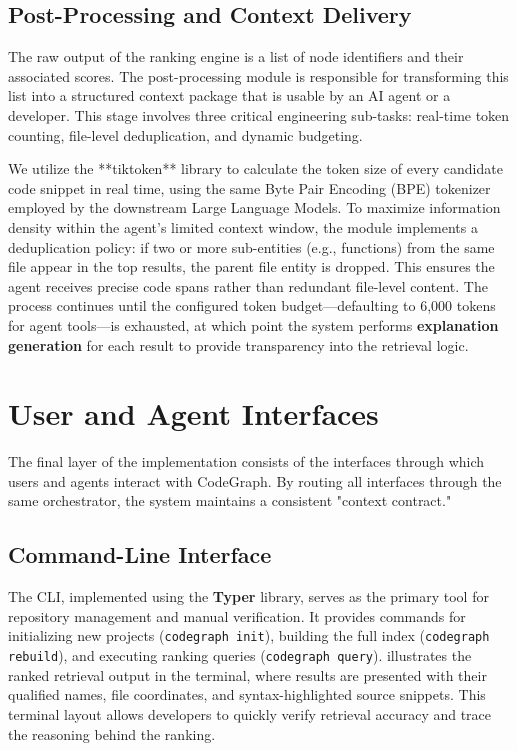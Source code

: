 \subsection{Post-Processing and Context Delivery}
\label{subsec:post-processing}

The raw output of the ranking engine is a list of node identifiers and their associated scores. The post-processing module is responsible for transforming this list into a structured context package that is usable by an AI agent or a developer. This stage involves three critical engineering sub-tasks: real-time token counting, file-level deduplication, and dynamic budgeting.

We utilize the **tiktoken** library to calculate the token size of every candidate code snippet in real time, using the same Byte Pair Encoding (BPE) tokenizer employed by the downstream Large Language Models. To maximize information density within the agent's limited context window, the module implements a deduplication policy: if two or more sub-entities (e.g., functions) from the same file appear in the top results, the parent file entity is dropped. This ensures the agent receives precise code spans rather than redundant file-level content. The process continues until the configured token budget—defaulting to 6,000 tokens for agent tools—is exhausted, at which point the system performs \textbf{explanation generation} for each result to provide transparency into the retrieval logic.

\section{User and Agent Interfaces}
\label{sec:user-agent-interfaces}

The final layer of the implementation consists of the interfaces through which users and agents interact with CodeGraph. By routing all interfaces through the same orchestrator, the system maintains a consistent "context contract."

\subsection{Command-Line Interface}
\label{subsec:cli-interface}

The CLI, implemented using the \textbf{Typer} library, serves as the primary tool for repository management and manual verification. It provides commands for initializing new projects (\texttt{codegraph init}), building the full index (\texttt{codegraph rebuild}), and executing ranking queries (\texttt{codegraph query}).  illustrates the ranked retrieval output in the terminal, where results are presented with their qualified names, file coordinates, and syntax-highlighted source snippets. This terminal layout allows developers to quickly verify retrieval accuracy and trace the reasoning behind the ranking. 

